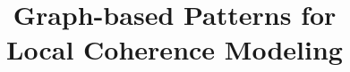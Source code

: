 \title{Graph-based Patterns for \\ Local Coherence Modeling}

\publishers{{\normalsize vorgelegt von} \\ Mohsen Mesgar}
 
\date{} 

\titlehead{Inauguraldissertation zur Erlangung der Doktorwürde der Neuphilologischen Fakultät der Ruprecht-Karls-Universität Heidelberg} 

\lowertitleback{Referent: Prof.\ Dr.\ Michael Strube\\ Korreferent: Prof.\ Dr.\ Katja Markert\\ Einreichung: August 2018}



